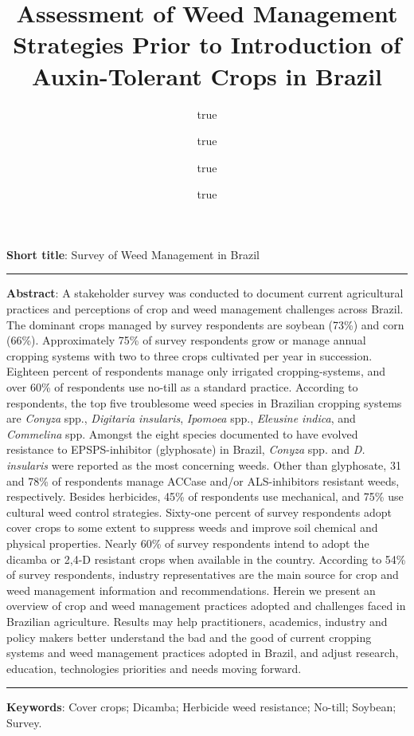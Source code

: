 \documentclass[
  12pt,
  a4paper]{article}
\title{Assessment of Weed Management Strategies Prior to Introduction of
Auxin-Tolerant Crops in Brazil}
\author{true \and true \and true \and true}
\date{}
\begin{document}
\maketitle

\textbf{Short title}: Survey of Weed Management in Brazil

\singlespace

\vspace{2mm}\hrule

\textbf{Abstract}: A stakeholder survey was conducted to document
current agricultural practices and perceptions of crop and weed
management challenges across Brazil. The dominant crops managed by
survey respondents are soybean (73\%) and corn (66\%). Approximately
75\% of survey respondents grow or manage annual cropping systems with
two to three crops cultivated per year in succession. Eighteen percent
of respondents manage only irrigated cropping-systems, and over 60\% of
respondents use no-till as a standard practice. According to
respondents, the top five troublesome weed species in Brazilian cropping
systems are \emph{Conyza} spp., \emph{Digitaria insularis},
\emph{Ipomoea} spp., \emph{Eleusine indica}, and \emph{Commelina} spp.
Amongst the eight species documented to have evolved resistance to
EPSPS-inhibitor (glyphosate) in Brazil, \emph{Conyza} spp. and \emph{D.
insularis} were reported as the most concerning weeds. Other than
glyphosate, 31 and 78\% of respondents manage ACCase and/or
ALS-inhibitors resistant weeds, respectively. Besides herbicides, 45\%
of respondents use mechanical, and 75\% use cultural weed control
strategies. Sixty-one percent of survey respondents adopt cover crops to
some extent to suppress weeds and improve soil chemical and physical
properties. Nearly 60\% of survey respondents intend to adopt the
dicamba or 2,4-D resistant crops when available in the country.
According to 54\% of survey respondents, industry representatives are
the main source for crop and weed management information and
recommendations. Herein we present an overview of crop and weed
management practices adopted and challenges faced in Brazilian
agriculture. Results may help practitioners, academics, industry and
policy makers better understand the bad and the good of current cropping
systems and weed management practices adopted in Brazil, and adjust
research, education, technologies priorities and needs moving forward.

\vspace{3mm}\hrule

\textbf{Keywords}: Cover crops; Dicamba; Herbicide weed resistance;
No-till; Soybean; Survey.
\end{document}
